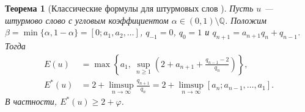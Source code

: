 \documentclass[a4paper,14pt]{extreport}
\theoremstyle{plain}
\newtheorem{theorem}{Теорема}[section]
\theoremstyle{definition}
\theoremstyle{remark}
\begin{document}
\begin{theorem}[Классические формулы для штурмовых слов
{\cite{DamanikLenz2002,Peltomaki2015,AdamczewskiAllouche2007}}]\label{thmconsn1}
Пусть $u$ --- штурмово слово с угловым коэффициентом
$\alpha\in(0,1)\setminus\mathbb Q$.
Положим $\beta=\min\{\alpha,1-\alpha\}=[0;a_1,a_2,\ldots]$,
$q_{-1}=0$, $q_0=1$ и
$q_{n+1}=a_{n+1}q_n+q_{n-1}$.
Тогда
\begin{align}
 E(u)&=\max\left\{a_1,\
       \sup_{n\ge1}\left(2+a_{n+1}+\frac{q_{n-1}-2}{q_n}\right)\right\},
       \label{eq:correct-index}\\
 E^*(u)&=2+\limsup_{n\to\infty}\frac{q_{n+1}}{q_n}
       =2+\limsup_{n\to\infty}[a_n;a_{n-1},\ldots,a_1].
       \label{eq:correct-asymptotic-index}
\end{align}
В частности, $E^*(u)\ge2+\varphi$.
\end{theorem}
\end{document}
